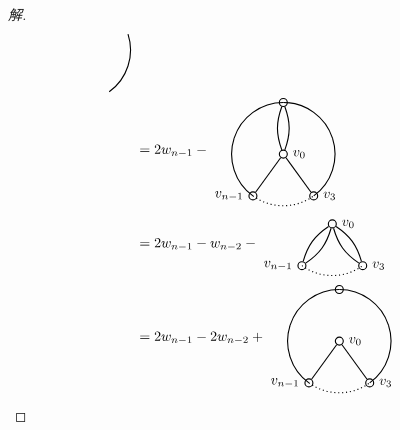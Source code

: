 \documentclass{article}
\begin{document}
\begin{CJK}{UTF8}{gbsn}
\begin{proof}[解]
\begin{align*}
\begin{tikzpicture}[auto,baseline={(current bounding box.center)},
    specification/.style ={circle, draw, thick, inner sep = 0pt, minimum size=2mm}]
   \draw[thick] (306:1.3cm) arc (-54:18:1.3cm);
 \end{tikzpicture}
\\
  &=2w_{n-1} -
    \begin{tikzpicture}[auto,baseline={(current bounding box.center)},
    specification/.style ={circle, draw, thick, inner sep = 0pt, minimum size=2mm}]
   \node[specification] (B)   at (90:1.3cm)  {};
   \node[specification] (D) [label=180:$v_{n-1}$] at (234:1.3cm)  {};
   \node[specification] (E)  [label=0:$v_3$] at (306:1.3cm)  {};
   \node[specification] (o)  [label=0:$v_0$] at (0,0)  {};
   \draw[thick] (B) to [bend left = 20]  (o);
   \draw[thick] (B) to [bend right = 20]  (o);
   \draw[thick] (D) to  (o);
   \draw[thick] (E) to  (o);
   \draw[thick] (18:1.3cm) arc (18:90:1.3cm);
   \draw[thick] (90:1.3cm) arc (90:162:1.3cm);
   \draw[thick] (162:1.3cm) arc (162:234:1.3cm);
   \draw[thick,dotted] (234:1.3cm) arc (234:306:1.3cm);
   \draw[thick] (306:1.3cm) arc (-54:18:1.3cm);
 \end{tikzpicture}
  \\
  &=2w_{n-1} - w_{n-2} -
        \begin{tikzpicture}[auto,baseline={(current bounding box.center)},
    specification/.style ={circle, draw, thick, inner sep = 0pt, minimum size=2mm}]
   \node[specification] (D) [label=180:$v_{n-1}$] at (234:1.3cm)  {};
   \node[specification] (E)  [label=0:$v_3$] at (306:1.3cm)  {};
   \node[specification] (o)  [label=0:$v_0$] at (0,0)  {};
   \draw[thick] (D) to [bend left = 20]  (o);
   \draw[thick] (D) to [bend right = 20]  (o);
   \draw[thick] (E) to [bend left = 20]  (o);
   \draw[thick] (E) to [bend right = 20]  (o);
   \draw[thick,dotted] (234:1.3cm) arc (234:306:1.3cm);
 \end{tikzpicture}\\
  &=2w_{n-1} - 2w_{n-2} +
        \begin{tikzpicture}[auto,baseline={(current bounding box.center)},
    specification/.style ={circle, draw, thick, inner sep = 0pt, minimum size=2mm}]
   \node[specification] (B)   at (90:1.3cm)  {};
   \node[specification] (D) [label=180:$v_{n-1}$] at (234:1.3cm)  {};
   \node[specification] (E)  [label=0:$v_3$] at (306:1.3cm)  {};
   \node[specification] (o)  [label=0:$v_0$] at (0,0)  {};
   \draw[thick] (D) to  (o);
   \draw[thick] (E) to  (o);
   \draw[thick] (18:1.3cm) arc (18:90:1.3cm);
   \draw[thick] (90:1.3cm) arc (90:162:1.3cm);
   \draw[thick] (162:1.3cm) arc (162:234:1.3cm);
   \draw[thick,dotted] (234:1.3cm) arc (234:306:1.3cm);
   \draw[thick] (306:1.3cm) arc (-54:18:1.3cm);

\end{tikzpicture}
\end{align*}
\end{proof}
\end{CJK}
\end{document}
